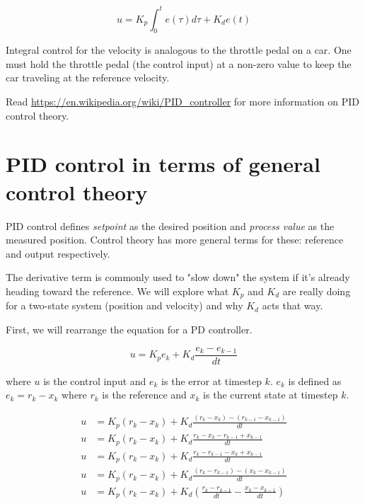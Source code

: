 \begin{theorem}
  \begin{equation}
    u = K_p \int_0^t e(\tau) d\tau + K_d e(t)
  \end{equation}
\end{theorem}

Integral control for the velocity is analogous to the throttle pedal on a car.
One must hold the throttle pedal (the control input) at a non-zero value to keep
the car traveling at the reference velocity.

Read \url{https://en.wikipedia.org/wiki/PID_controller} for more information on
PID control theory.

\section{PID control in terms of general control theory}

PID control defines \textit{setpoint} as the desired position and
\textit{process value} as the measured position. Control theory has more general
terms for these: \gls{reference} and \gls{output} respectively.

The derivative term is commonly used to "slow down" the system if it's already
heading toward the \gls{reference}. We will explore what $K_p$ and $K_d$ are
really doing for a two-state system (position and velocity) and why $K_d$ acts
that way.

First, we will rearrange the equation for a PD controller.

\begin{equation*}
  u = K_p e_k + K_d \frac{e_k - e_{k-1}}{dt}
\end{equation*}

where $u$ is the control input and $e_k$ is the error at timestep $k$. $e_k$ is
defined as $e_k = r_k - x_k$ where $r_k$ is the reference and $x_k$ is the
current state at timestep $k$.

\begin{align*}
  u &= K_p (r_k - x_k) + K_d \frac{(r_k - x_k) - (r_{k-1} - x_{k-1})}{dt} \\
  u &= K_p (r_k - x_k) + K_d \frac{r_k - x_k - r_{k-1} + x_{k-1}}{dt} \\
  u &= K_p (r_k - x_k) + K_d \frac{r_k - r_{k-1} - x_k + x_{k-1}}{dt} \\
  u &= K_p (r_k - x_k) + K_d \frac{(r_k - r_{k-1}) - (x_k - x_{k-1})}{dt} \\
  u &= K_p (r_k - x_k) + K_d \left(\frac{r_k - r_{k-1}}{dt} -
    \frac{x_k - x_{k-1}}{dt}\right)
\end{align*}

